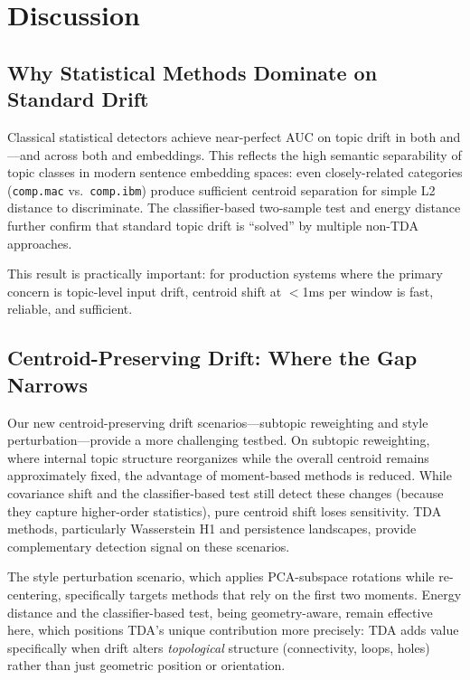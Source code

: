 \section{Discussion}
\label{sec:discussion}

\subsection{Why Statistical Methods Dominate on Standard Drift}

Classical statistical detectors achieve near-perfect AUC on topic drift in both \agnews and \twentyng---and across both \minilm and \bertbase embeddings. This reflects the high semantic separability of topic classes in modern sentence embedding spaces: even closely-related categories (\texttt{comp.mac} vs.\ \texttt{comp.ibm}) produce sufficient centroid separation for simple L2 distance to discriminate. The classifier-based two-sample test and energy distance further confirm that standard topic drift is ``solved'' by multiple non-TDA approaches.

This result is practically important: for production systems where the primary concern is topic-level input drift, centroid shift at $<$1ms per window is fast, reliable, and sufficient.

\subsection{Centroid-Preserving Drift: Where the Gap Narrows}

Our new centroid-preserving drift scenarios---subtopic reweighting and style perturbation---provide a more challenging testbed. On subtopic reweighting, where internal topic structure reorganizes while the overall centroid remains approximately fixed, the advantage of moment-based methods is reduced. While covariance shift and the classifier-based test still detect these changes (because they capture higher-order statistics), pure centroid shift loses sensitivity. TDA methods, particularly Wasserstein H1 and persistence landscapes, provide complementary detection signal on these scenarios.

The style perturbation scenario, which applies PCA-subspace rotations while re-centering, specifically targets methods that rely on the first two moments. Energy distance and the classifier-based test, being geometry-aware, remain effective here, which positions TDA's unique contribution more precisely: TDA adds value specifically when drift alters \emph{topological} structure (connectivity, loops, holes) rather than just geometric position or orientation.

